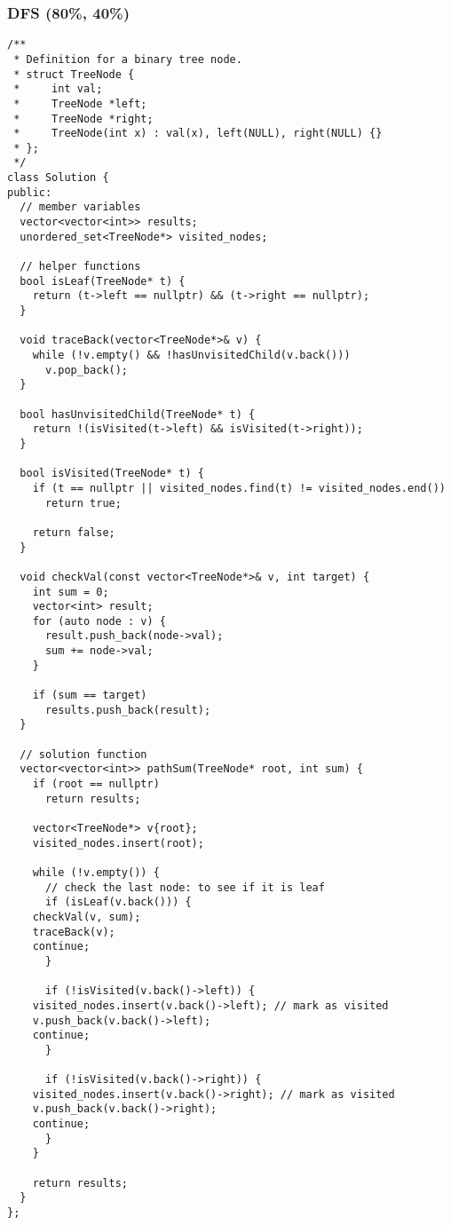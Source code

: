 \documentclass[12pt]{book}
\begin{document}
\subsubsection{DFS (80\%, 40\%)}
\label{sec:org5082df2}
\begin{verbatim}
/**
 * Definition for a binary tree node.
 * struct TreeNode {
 *     int val;
 *     TreeNode *left;
 *     TreeNode *right;
 *     TreeNode(int x) : val(x), left(NULL), right(NULL) {}
 * };
 */
class Solution {
public:
  // member variables
  vector<vector<int>> results;
  unordered_set<TreeNode*> visited_nodes;

  // helper functions
  bool isLeaf(TreeNode* t) {
    return (t->left == nullptr) && (t->right == nullptr);
  }

  void traceBack(vector<TreeNode*>& v) {
    while (!v.empty() && !hasUnvisitedChild(v.back()))
      v.pop_back();
  }

  bool hasUnvisitedChild(TreeNode* t) {
    return !(isVisited(t->left) && isVisited(t->right));
  }

  bool isVisited(TreeNode* t) {
    if (t == nullptr || visited_nodes.find(t) != visited_nodes.end())
      return true;

    return false;
  }

  void checkVal(const vector<TreeNode*>& v, int target) {
    int sum = 0;
    vector<int> result;
    for (auto node : v) {
      result.push_back(node->val);
      sum += node->val;
    }

    if (sum == target)
      results.push_back(result);
  }

  // solution function
  vector<vector<int>> pathSum(TreeNode* root, int sum) {
    if (root == nullptr)
      return results;

    vector<TreeNode*> v{root};
    visited_nodes.insert(root);

    while (!v.empty()) {
      // check the last node: to see if it is leaf 
      if (isLeaf(v.back())) {
	checkVal(v, sum);
	traceBack(v);
	continue;
      }

      if (!isVisited(v.back()->left)) {
	visited_nodes.insert(v.back()->left); // mark as visited
	v.push_back(v.back()->left);
	continue;
      }

      if (!isVisited(v.back()->right)) {
	visited_nodes.insert(v.back()->right); // mark as visited
	v.push_back(v.back()->right);
	continue;
      }
    }

    return results;
  }
};
\end{verbatim}
\end{document}
